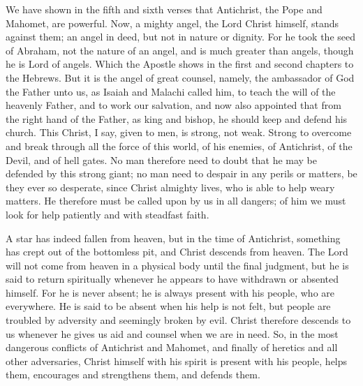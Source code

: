 We have shown in the fifth and sixth verses that Antichrist, the Pope and Mahomet, are powerful. Now, a mighty angel, the Lord Christ himself, stands against them; an angel in deed, but not in nature or dignity. For he took the seed of Abraham, not the nature of an angel, and is much greater than angels, though he is Lord of angels. Which the Apostle shows in the first and second chapters to the Hebrews. But it is the angel of great counsel, namely, the ambassador of God the Father unto us, as Isaiah and Malachi called him, to teach the will of the heavenly Father, and to work our salvation, and now also appointed that from the right hand of the Father, as king and bishop, he should keep and defend his church. This Christ, I say, given to men, is strong, not weak. Strong to overcome and break through all the force of this world, of his enemies, of Antichrist, of the Devil, and of hell gates. No man therefore need to doubt that he may be defended by this strong giant; no man need to despair in any perils or matters, be they ever so desperate, since Christ almighty lives, who is able to help weary matters. He therefore must be called upon by us in all dangers; of him we must look for help patiently and with steadfast faith.

A star has indeed fallen from heaven, but in the time of Antichrist, something has crept out of the bottomless pit, and Christ descends from heaven. The Lord will not come from heaven in a physical body until the final judgment, but he is said to return spiritually whenever he appears to have withdrawn or absented himself. For he is never absent; he is always present with his people, who are everywhere. He is said to be absent when his help is not felt, but people are troubled by adversity and seemingly broken by evil. Christ therefore descends to us whenever he gives us aid and counsel when we are in need. So, in the most dangerous conflicts of Antichrist and Mahomet, and finally of heretics and all other adversaries, Christ himself with his spirit is present with his people, helps them, encourages and strengthens them, and defends them.


